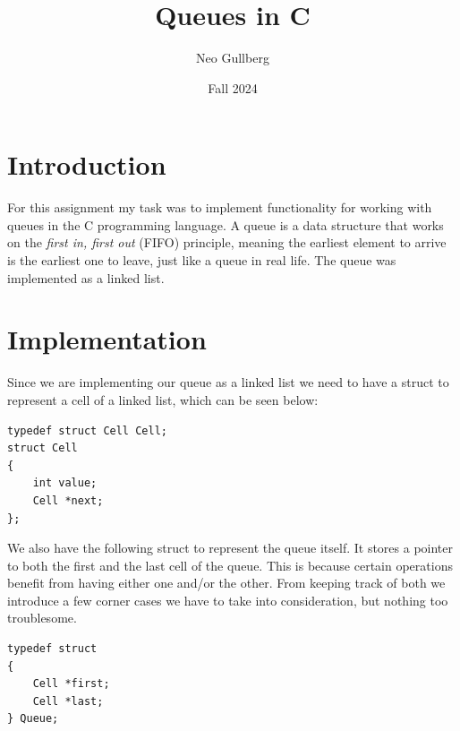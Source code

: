 \documentclass[a4paper, 11pt]{article}
\begin{document}
\title{
	\textbf{Queues in C}
}
\author{Neo Gullberg}
\date{Fall 2024}
\maketitle

\section{Introduction}
	For this assignment my task was to implement functionality for working with queues in the C programming language.
	A queue is a data structure that works on the \textit{first in, first out} (FIFO) principle,
	meaning the earliest element to arrive is the earliest one to leave, just like a queue in real life.
	The queue was implemented as a linked list.

\section{Implementation}
	Since we are implementing our queue as a linked list we need to have a struct to represent a cell of a linked list, which can be seen below:
	\begin{verbatim}
typedef struct Cell Cell;
struct Cell
{
	int value;
	Cell *next;
};
	\end{verbatim}
	We also have the following struct to represent the queue itself. It stores a pointer to both the first and the last cell of the queue.
	This is because certain operations benefit from having either one and/or the other.
	From keeping track of both we introduce a few corner cases we have to take into consideration, but nothing too troublesome.
	\begin{verbatim}
typedef struct
{
	Cell *first;
	Cell *last;
} Queue;
	\end{verbatim}
\end{document}
